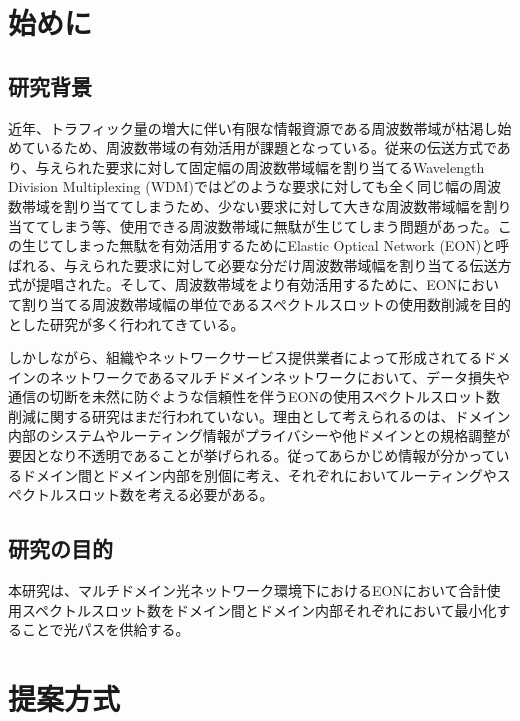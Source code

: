 \documentclass[a4j,twocolumn,fleqn]{jarticle}
\begin{document}
 
\Title
\section{始めに}
\subsection{研究背景}
近年、トラフィック量の増大に伴い有限な情報資源である周波数帯域が枯渇し始めているため、周波数帯域の有効活用が課題となっている。従来の伝送方式であり、与えられた要求に対して固定幅の周波数帯域幅を割り当てるWavelength Division Multiplexing (WDM)ではどのような要求に対しても全く同じ幅の周波数帯域を割り当ててしまうため、少ない要求に対して大きな周波数帯域幅を割り当ててしまう等、使用できる周波数帯域に無駄が生じてしまう問題があった。この生じてしまった無駄を有効活用するためにElastic Optical Network (EON)と呼ばれる、与えられた要求に対して必要な分だけ周波数帯域幅を割り当てる伝送方式が提唱された。そして、周波数帯域をより有効活用するために、EONにおいて割り当てる周波数帯域幅の単位であるスペクトルスロットの使用数削減を目的とした研究が多く行われてきている。

しかしながら、組織やネットワークサービス提供業者によって形成されてるドメインのネットワークであるマルチドメインネットワークにおいて、データ損失や通信の切断を未然に防ぐような信頼性を伴うEONの使用スペクトルスロット数削減に関する研究はまだ行われていない。理由として考えられるのは、ドメイン内部のシステムやルーティング情報がプライバシーや他ドメインとの規格調整が要因となり不透明であることが挙げられる。従ってあらかじめ情報が分かっているドメイン間とドメイン内部を別個に考え、それぞれにおいてルーティングやスペクトルスロット数を考える必要がある。
\subsection{研究の目的}
本研究は、マルチドメイン光ネットワーク環境下におけるEONにおいて合計使用スペクトルスロット数をドメイン間とドメイン内部それぞれにおいて最小化することで光パスを供給する。
\section{提案方式}
%
\end{document}
